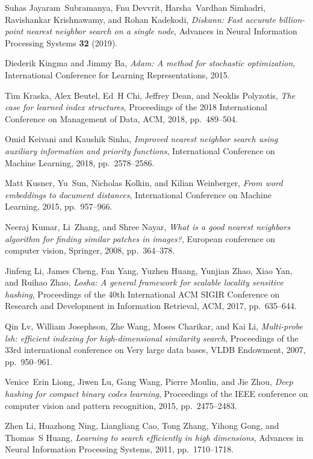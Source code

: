 \documentclass[11pt]{article}
\begin{document}
\begin{thebibliography}{10}
\begin{small}
Suhas Jayaram~Subramanya, Fnu Devvrit, Harsha~Vardhan Simhadri, Ravishankar Krishnawamy, and Rohan Kadekodi, \emph{Diskann: Fast accurate billion-point nearest neighbor search on a single node}, Advances in Neural Information Processing Systems \textbf{32} (2019).

Diederik Kingma and Jimmy Ba, \emph{Adam: A method for stochastic optimization}, International Conference for Learning Representations, 2015.

Tim Kraska, Alex Beutel, Ed~H Chi, Jeffrey Dean, and Neoklis Polyzotis, \emph{The case for learned index structures}, Proceedings of the 2018 International Conference on Management of Data, ACM, 2018, pp.~489--504.

Omid Keivani and Kaushik Sinha, \emph{Improved nearest neighbor search using auxiliary information and priority functions}, International Conference on Machine Learning, 2018, pp.~2578--2586.

Matt Kusner, Yu~Sun, Nicholas Kolkin, and Kilian Weinberger, \emph{From word embeddings to document distances}, International Conference on Machine Learning, 2015, pp.~957--966.

Neeraj Kumar, Li~Zhang, and Shree Nayar, \emph{What is a good nearest neighbors algorithm for finding similar patches in images?}, European conference on computer vision, Springer, 2008, pp.~364--378.

Jinfeng Li, James Cheng, Fan Yang, Yuzhen Huang, Yunjian Zhao, Xiao Yan, and Ruihao Zhao, \emph{Losha: A general framework for scalable locality sensitive hashing}, Proceedings of the 40th International ACM SIGIR Conference on Research and Development in Information Retrieval, ACM, 2017, pp.~635--644.

Qin Lv, William Josephson, Zhe Wang, Moses Charikar, and Kai Li, \emph{Multi-probe lsh: efficient indexing for high-dimensional similarity search}, Proceedings of the 33rd international conference on Very large data bases, VLDB Endowment, 2007, pp.~950--961.

Venice~Erin Liong, Jiwen Lu, Gang Wang, Pierre Moulin, and Jie Zhou, \emph{Deep hashing for compact binary codes learning}, Proceedings of the IEEE conference on computer vision and pattern recognition, 2015, pp.~2475--2483.

Zhen Li, Huazhong Ning, Liangliang Cao, Tong Zhang, Yihong Gong, and Thomas~S Huang, \emph{Learning to search efficiently in high dimensions}, Advances in Neural Information Processing Systems, 2011, pp.~1710--1718.


\end{small}
\end{thebibliography}
\end{document}
